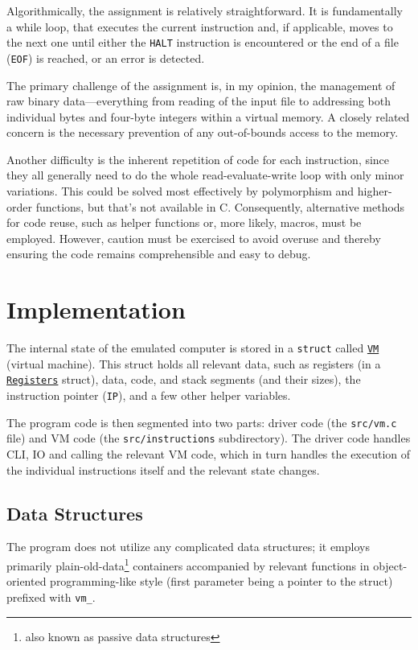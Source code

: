 \documentclass[10pt,a4paper,final]{article}
\newcommand{\code}[1]{\texttt{#1}}
\begin{document}
Algorithmically, the assignment is relatively straightforward. It is
fundamentally a while loop, that executes the current instruction and, if
applicable, moves to the next one until either the \code{HALT} instruction is
encountered or the end of a file (\code{EOF}) is reached, or an error is
detected.

The primary challenge of the assignment is, in my opinion, the management of raw
binary data---everything from reading of the input file to addressing both
individual bytes and four-byte integers within a virtual memory. A closely
related concern is the necessary prevention of any out-of-bounds access to the
memory.

Another difficulty is the inherent repetition of code for each instruction,
since they all generally need to do the whole read-evaluate-write loop with only
minor variations. This could be solved most effectively by polymorphism and
higher-order functions, but that's not available in C. Consequently, alternative
methods for code reuse, such as helper functions or, more likely, macros, must
be employed. However, caution must be exercised to avoid overuse and thereby
ensuring the code remains comprehensible and easy to debug.

\section{Implementation}
\label{sec:impl}

The internal state of the emulated computer is stored in a \code{struct} called
\hyperlink{vm}{\code{VM}} (virtual machine). This struct holds all relevant
data, such as registers (in a \hyperlink{registers}{\code{Registers}} struct),
data, code, and stack segments (and their sizes), the instruction pointer
(\code{IP}), and a few other helper variables.

The program code is then segmented into two parts: driver code (the
\code{src/vm.c} file) and VM code (the \code{src/instructions} subdirectory).
The driver code handles CLI, IO and calling the relevant VM code, which in turn
handles the execution of the individual instructions itself and the relevant
state changes.

\subsection{Data Structures}

The program does not utilize any complicated data structures; it employs
primarily plain-old-data\footnote{also known as passive data structures}
containers accompanied by relevant functions in object-oriented programming-like
style (first parameter being a pointer to the struct) prefixed with \code{vm_}.
\end{document}
